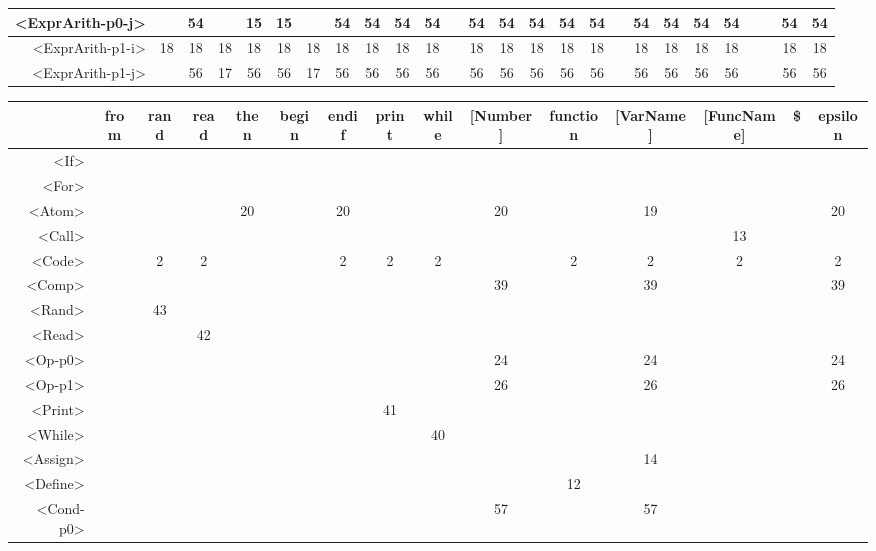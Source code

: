 \begin{tabular}{r|c@{ }c@{ }c@{ }c@{ }c@{ }c@{ }c@{ }c@{ }c@{ }c@{ }c@{ }c@{ }c@{ }c@{ }c@{ }c@{ }c@{ }c@{ }c@{ }c@{ }c@{ }c@{ }c@{ }c@{ }c@{ }}
<ExprArith-p0-j> &   & 54 &   & 15 & 15 &   & 54 & 54 & 54 & 54 &   & 54 & 54 & 54 & 54 & 54 &   & 54 & 54 & 54 & 54 &   &   & 54 & 54 \\\hline
<ExprArith-p1-i> & 18 & 18 & 18 & 18 & 18 & 18 & 18 & 18 & 18 & 18 &   & 18 & 18 & 18 & 18 & 18 &   & 18 & 18 & 18 & 18 &   &   & 18 & 18 \\\hline
<ExprArith-p1-j> &   & 56 & 17 & 56 & 56 & 17 & 56 & 56 & 56 & 56 &   & 56 & 56 & 56 & 56 & 56 &   & 56 & 56 & 56 & 56 &   &   & 56 & 56 \\\hline
\end{tabular}


\begin{tabular}{r|c@{ }c@{ }c@{ }c@{ }c@{ }c@{ }c@{ }c@{ }c@{ }c@{ }c@{ }c@{ }c@{ }c@{ }}
 & from & rand & read & then & begin & endif & print & while & [Number] & function & [VarName] & [FuncName] & \$ & epsilon \\\hline
<If> &   &   &   &   &   &   &   &   &   &   &   &   &   &   \\\hline
<For> &   &   &   &   &   &   &   &   &   &   &   &   &   &   \\\hline
<Atom> &   &   &   & 20 &   & 20 &   &   & 20 &   & 19 &   &   & 20 \\\hline
<Call> &   &   &   &   &   &   &   &   &   &   &   & 13 &   &   \\\hline
<Code> &   & 2 & 2 &   &   & 2 & 2 & 2 &   & 2 & 2 & 2 &   & 2 \\\hline
<Comp> &   &   &   &   &   &   &   &   & 39 &   & 39 &   &   & 39 \\\hline
<Rand> &   & 43 &   &   &   &   &   &   &   &   &   &   &   &   \\\hline
<Read> &   &   & 42 &   &   &   &   &   &   &   &   &   &   &   \\\hline
<Op-p0> &   &   &   &   &   &   &   &   & 24 &   & 24 &   &   & 24 \\\hline
<Op-p1> &   &   &   &   &   &   &   &   & 26 &   & 26 &   &   & 26 \\\hline
<Print> &   &   &   &   &   &   & 41 &   &   &   &   &   &   &   \\\hline
<While> &   &   &   &   &   &   &   & 40 &   &   &   &   &   &   \\\hline
<Assign> &   &   &   &   &   &   &   &   &   &   & 14 &   &   &   \\\hline
<Define> &   &   &   &   &   &   &   &   &   & 12 &   &   &   &   \\\hline
<Cond-p0> &   &   &   &   &   &   &   &   & 57 &   & 57 &   &   &   \\\hline

\end{tabular}
